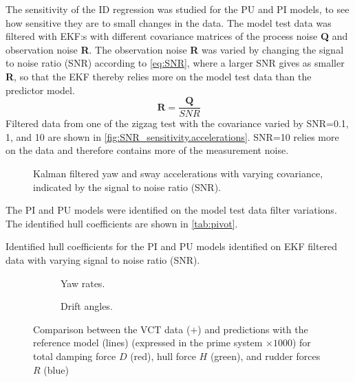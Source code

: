 The sensitivity of the ID regression was studied for the PU and PI models, to see how sensitive they are to small changes in the data.
The model test data was filtered with EKF:s with different covariance matrices of the process noise \textbf{Q} and observation noise \textbf{R}. The observation noise \textbf{R} was varied by changing the signal to noise ratio (SNR) according to \autoref{eq:SNR}, where a larger SNR gives as smaller \textbf{R}, so that the EKF thereby relies more on the model test data than the predictor model.
\begin{equation}
    \label{eq:SNR}
    \mathbf{R} = \frac{\mathbf{Q}}{SNR}
\end{equation}
Filtered data from one of the zigzag test with the covariance varied by SNR=0.1, 1, and 10 are shown in \autoref{fig:SNR_sensitivity.accelerations}. SNR=10 relies more on the data and therefore contains more of the measurement noise.
\begin{figure}[h]
    \begin{center}
        
        \caption{Kalman filtered yaw and sway accelerations with varying covariance, indicated by the signal to noise ratio (SNR).}
        \label{fig:SNR_sensitivity.accelerations}
    \end{center}
\end{figure}
The PI and PU models were identified on the model test data filter variations. The identified hull coefficients are shown in \autoref{tab:pivot}.
\begin{table}[h]
    \centering
    \caption{Identified hull coefficients for the PI and PU models identified on EKF filtered data with varying signal to noise ratio (SNR).}
    \label{tab:pivot}
\end{table}
\begin{figure}
    \centering
    \begin{subfigure}[b]{0.49\textwidth}
        \centering
        
        \caption{Yaw rates.}
        \label{fig:vct_circle}
    \end{subfigure}
    \vfill
    \begin{subfigure}[b]{0.49\textwidth}
        \centering
        
        \caption{Drift angles.}
        \label{fig:vct_drift_angle}
    \end{subfigure}
    
    \caption{Comparison between the VCT data ($+$) and predictions with the reference model (lines) (expressed in the prime system $\times 1000$) for total damping force $D$ (red), hull force $H$ (green), and rudder forces $R$ (blue)}
    \label{fig:vct}
\end{figure}